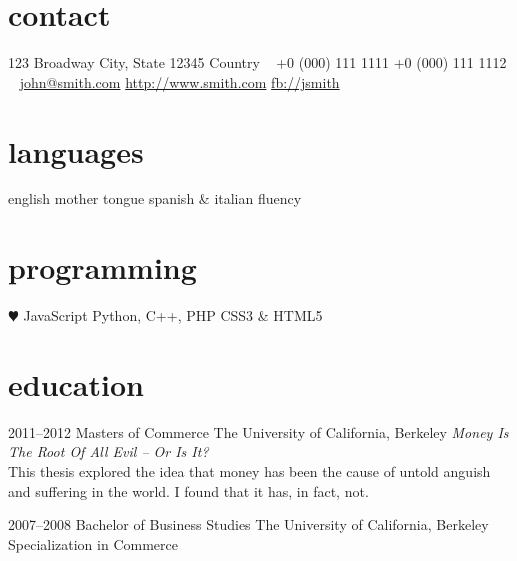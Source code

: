 \documentclass[nocolors]{friggeri-cv-a4}
\begin{document}


\begin{aside} %
\section{contact}
123 Broadway
City, State 12345
Country
~
+0 (000) 111 1111
+0 (000) 111 1112
~
\href{mailto:john@smith.com}{john@smith.com}
\href{http://www.smith.com}{http://www.smith.com}
\href{http://facebook.com/johnsmith}{fb://jsmith}
\section{languages}
english mother tongue
spanish \& italian fluency
\section{programming}
{\color{red} $\varheartsuit$} JavaScript
Python, C++, PHP
CSS3 \& HTML5
\end{aside}


\section{education}

\begin{entrylist}


\entry
{2011--2012}
{Masters {\normalfont of Commerce}}
{The University of California, Berkeley}
{\emph{Money Is The Root Of All Evil -- Or Is It?} \\ This thesis explored the idea that money has been the cause of untold anguish and suffering in the world. I found that it has, in fact, not.}


\entry
{2007--2008}
{Bachelor {\normalfont of Business Studies}}
{The University of California, Berkeley}
{Specialization in Commerce}


\end{entrylist}
\end{document}
